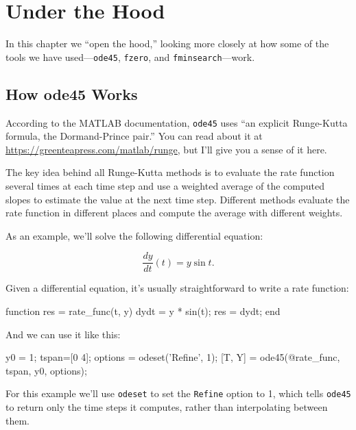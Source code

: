 \chapter{Under the Hood}
\label{how}

In this chapter we ``open the hood,'' looking more closely at how some of the tools we have used---\lstinline{ode45}, \lstinline{fzero}, and \lstinline{fminsearch}---work.


\section{How ode45 Works}
\label{howode45}

According to the MATLAB documentation, \lstinline{ode45} uses ``an explicit Runge-Kutta formula, the Dormand-Prince pair.''  You can read about it at \url{https://greenteapress.com/matlab/runge}, but I'll give you a sense of it here.


The key idea behind all Runge-Kutta methods is to evaluate the rate function several times at each time step and use a weighted average of the computed slopes to estimate the value at the next time step.
Different methods evaluate the rate function in different places and compute the average with different weights.


As an example, we'll solve the following differential equation:

\[ \frac{dy}{dt}(t) = y \sin t. \]

Given a differential equation, it's usually straightforward to write a rate function:

\begin{code}
function res = rate_func(t, y)
    dydt = y * sin(t);
    res = dydt;
end
\end{code}

And we can use it like this:

\begin{code}
    y0 = 1;
    tspan=[0 4];
    options = odeset('Refine', 1);
    [T, Y] = ode45(@rate_func, tspan, y0, options);
\end{code}

For this example we'll use \lstinline{odeset} to set the \lstinline{Refine} option to 1, which tells \lstinline{ode45} to return only the time steps it computes, rather than interpolating between them.


